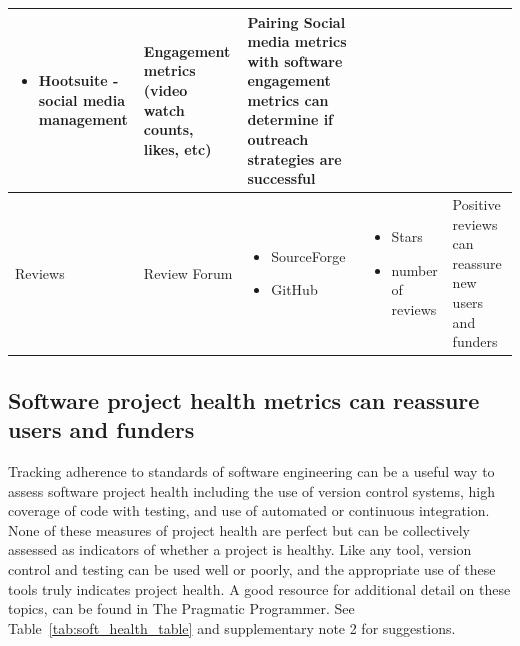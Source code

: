 \documentclass{article}
\begin{document}
\begin{table}
\begin{tabular} {|p{}|p{}|p{}|p{}|p{}|}
    \begin{itemize}
        \item Hootsuite \cite{hootsuite} - social media management
    \end{itemize} &   Engagement metrics (video watch counts, likes, etc)  & Pairing Social media  metrics with software engagement metrics can determine if outreach strategies are successful \\
    \hline
       \multirow{3}{*}{Reviews}
    & Review Forum & 
    \begin{itemize}
        \item SourceForge
        \item GitHub
    \end{itemize} &  \begin{itemize}
        \item Stars
        \item number of reviews
    \end{itemize} & Positive reviews can reassure new users and funders\\ 
    \hline
  \end{tabular}
  \label{tab:inf_table}
\end{table}



\subsection{Software project health metrics can reassure users and funders}
Tracking adherence to standards of software engineering can be a useful way to assess software project health including the use of version control systems, high coverage of code with testing, and use of automated or continuous integration. None of these measures of project health are perfect but can be collectively assessed as indicators of whether a project is healthy. Like any tool, version control and testing can be used well or poorly, and the appropriate use of these tools truly indicates project health. A good resource for additional detail on these topics, can be found in The Pragmatic Programmer\cite{thomas_pragmatic_2019}. See Table~\ref{tab:soft_health_table} and supplementary note 2 for suggestions.
\end{document}
